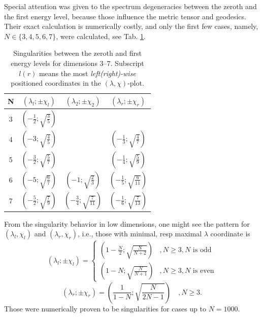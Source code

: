 Special attention was given to the spectrum degeneracies between the zeroth and the first energy level, because those influence the metric tensor and geodesics. Their exact calculation is numerically costly, and only the first few cases, namely, $N\in\{3,4,5,6,7\}$, were calculated, see Tab. \ref{tab:singularities}. 
\begin{table}[H]
    \centering
    \begin{tabular}{c||c|c|c}
     N&$(\lambda_l;\pm\chi_l)$&$(\lambda_2;\pm\chi_2)$&$(\lambda_r;\pm\chi_r)$        \\ \hline\hline
     3&$(-\frac{1}{2};\sqrt{\frac{3}{5}}) $&                                       &                                         \\
     4&$(-3          ;\sqrt{\frac{4}{5}}) $&                                       & $(-\frac{1}{3};\sqrt{\frac{4}{7}})$     \\
     5&$(-\frac{3}{2};\sqrt{\frac{5}{7}}) $&                                       & $(-\frac{1}{4};\sqrt{\frac{5}{9}})$     \\
     6&$(-5          ;\sqrt{\frac{6}{7}}) $&$(-1          ;\sqrt{\frac{2}{3}}) $   & $(-\frac{1}{5};\sqrt{\frac{6}{11}})$     \\
     7&$(-\frac{5}{2};\sqrt{\frac{7}{9}}) $&$(-\frac{3}{4};\sqrt{\frac{7}{11}}) $  & $(-\frac{1}{6};\sqrt{\frac{7}{13}})$ 
    \end{tabular}
    \caption{Singularities between the zeroth and first energy levels for dimensions 3--7. Subscript $l(r)$ means the most \emph{left(right)-wise} positioned coordinates in the $(\lambda,\chi)$-plot.}
    \label{tab:singularities}
    \end{table} 

From the singularity behavior in low dimensions, one might see the pattern
 for $(\lambda_l,\chi_l)$ and $(\lambda_r,\chi_r)$, i.e., those with minimal, resp maximal $\lambda$ coordinate is
\begin{equation}
    (\lambda_l ;\pm\chi_l)= \begin{cases}
        \left(1-\frac{N}{2};\sqrt{\frac{N}{N+2}}\right) & , N\geq 3,N\text{ is odd}\\
        \left(1-N;\sqrt{\frac{N}{N+1}}\right) & , N\geq 3,N\text{ is even}
    \end{cases}
    \label{eq:singularityCoordinateFormulaLeft}
\end{equation}
\begin{equation}
    (\lambda_r ;\pm\chi_r)= 
        \left(\frac{1}{1-N};\sqrt{\frac{N}{2N-1}}\right)\quad , N\geq 3.
        \label{eq:singularityCoordinateFormulaRight}
\end{equation}
Those were numerically proven to be singularities for cases up to $N=1000$. 

